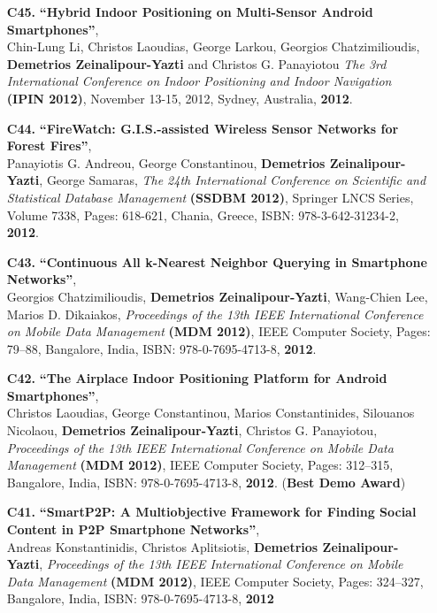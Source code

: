 \documentclass[10pt]{article}
\begin{document}
\begin{enumerate}
\item[{\bf C45.}]
\label{C45}
{\bf ``Hybrid Indoor Positioning on Multi-Sensor Android Smartphones''}, \\
Chin-Lung Li, Christos Laoudias, George Larkou, Georgios Chatzimilioudis, {\bf Demetrios Zeinalipour-Yazti} and Christos G. Panayiotou
{\em The 3rd International Conference on Indoor Positioning and Indoor Navigation} {\bf (IPIN 2012)},
November 13-15, 2012, Sydney, Australia, {\bf 2012}.
  
\item[{\bf C44.}]
\label{C44}
{\bf ``FireWatch: G.I.S.-assisted Wireless Sensor Networks for Forest Fires''}, \\
Panayiotis G. Andreou, George Constantinou, {\bf Demetrios Zeinalipour-Yazti}, George Samaras,
{\em The 24th International Conference on Scientific and Statistical Database Management} {\bf (SSDBM 2012)},
Springer LNCS Series, Volume 7338, Pages: 618-621, Chania, Greece, ISBN: 978-3-642-31234-2, {\bf 2012}.

\item[{\bf C43.}]
\label{C43}
{\bf ``Continuous All k-Nearest Neighbor Querying in Smartphone Networks''}, \\
Georgios Chatzimilioudis, {\bf Demetrios Zeinalipour-Yazti}, Wang-Chien Lee, Marios D. Dikaiakos,
{\em Proceedings of the 13th IEEE International Conference on Mobile Data Management} {\bf (MDM 2012)}, IEEE Computer Society, Pages: 79--88, Bangalore, India, ISBN: 978-0-7695-4713-8, {\bf 2012}. 

\item[{\bf C42.}]
\label{C42}
{\bf ``The Airplace Indoor Positioning Platform for Android Smartphones''}, \\
Christos Laoudias, George Constantinou, Marios Constantinides, Silouanos Nicolaou, {\bf Demetrios Zeinalipour-Yazti}, Christos G. Panayiotou,
{\em Proceedings of the 13th IEEE International Conference on Mobile Data Management} {\bf (MDM 2012)},  IEEE Computer Society, Pages: 312--315, Bangalore, India, ISBN: 978-0-7695-4713-8, {\bf 2012}. ({\bf Best Demo Award})

\item[{\bf C41.}]
\label{C41}
{\bf ``SmartP2P: A Multiobjective Framework for Finding Social Content in P2P Smartphone Networks''}, \\
Andreas Konstantinidis, Christos Aplitsiotis, {\bf Demetrios Zeinalipour-Yazti},
{\em Proceedings of the 13th IEEE International Conference on Mobile Data Management} {\bf (MDM 2012)}, 
IEEE Computer Society, Pages: 324--327, Bangalore, India, ISBN: 978-0-7695-4713-8, {\bf 2012} 


\end{enumerate}
\end{document}
